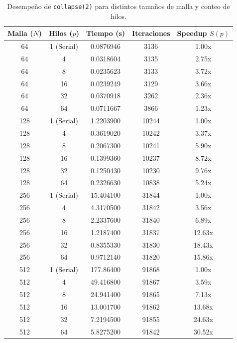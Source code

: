 \documentclass[11pt,a4paper]{article}
\begin{document}
\begin{table}[H]
\centering
\renewcommand{\arraystretch}{1.2}
\small
\begin{tabular}{|c|c|c|c|c|}
\hline
\textbf{Malla ($N$)} & \textbf{Hilos ($p$)} & \textbf{Tiempo (s)} & \textbf{Iteraciones} & \textbf{Speedup $S(p)$} \\ \hline
64 & 1 (Serial) & 0.0876946 & 3136 & 1.00x \\ 
64 & 4 & 0.0318604 & 3135 & 2.75x \\ 
64 & 8 & 0.0235623 & 3133 & 3.72x \\ 
64 & 16 & 0.0239249 & 3129 & 3.66x \\ 
64 & 32 & 0.0370918 & 3262 & 2.36x \\ 
64 & 64 & 0.0711667 & 3866 & 1.23x \\ \hline
128 & 1 (Serial) & 1.2203900 & 10244 & 1.00x \\ 
128 & 4 & 0.3619020 & 10242 & 3.37x \\ 
128 & 8 & 0.2067300 & 10241 & 5.90x \\ 
128 & 16 & 0.1399360 & 10237 & 8.72x \\ 
128 & 32 & 0.1250430 & 10230 & 9.76x \\ 
128 & 64 & 0.2326630 & 10838 & 5.24x \\ \hline
256 & 1 (Serial) & 15.404100 & 31844 & 1.00x \\ 
256 & 4 & 4.3170500 & 31842 & 3.56x \\ 
256 & 8 & 2.2337600 & 31840 & 6.89x \\ 
256 & 16 & 1.2187400 & 31837 & 12.63x \\ 
256 & 32 & 0.8355330 & 31830 & 18.43x \\ 
256 & 64 & 0.9712140 & 31820 & 15.86x \\ \hline
512 & 1 (Serial) & 177.86400 & 91868 & 1.00x \\ 
512 & 4 & 49.416800 & 91867 & 3.59x \\ 
512 & 8 & 24.941400 & 91865 & 7.13x \\ 
512 & 16 & 13.001700 & 91862 & 13.68x \\ 
512 & 32 & 7.2194500 & 91855 & 24.63x \\ 
512 & 64 & 5.8275200 & 91842 & 30.52x \\ \hline
\end{tabular}
\caption{Desempeño de \texttt{collapse(2)} para distintos tamaños de malla y conteo de hilos.}
\label{tab:resultados_collapse}
\end{table}
\end{document}
